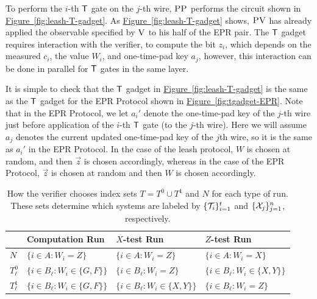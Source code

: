 \documentclass[11pt]{article}
\numberwithin{equation}{section}
\theoremstyle{definition}
\theoremstyle{plain}
\newcommand{\expref}[2]{\hyperref[#2]{#1~\ref{#2}}}
\newcommand{\ver}{\textsc{V}}
\newcommand{\pv}{\textsc{PV}}
\newcommand{\pp}{\textsc{PP}}
\begin{document}
To perform the $i$-th $\sf T$ gate on the $j$-th wire, $\pp$ performs the circuit shown in \expref{Figure}{fig:leash-T-gadget}. As \expref{Figure}{fig:leash-T-gadget} shows, $\pv$ has already applied the observable specified by $\ver$ to his half of the EPR pair. The $\sf T$ gadget requires interaction with the verifier, to compute the bit $z_i$, which depends on the measured $c_i$, the value $W_i$, and one-time-pad key $a_j$, however, this interaction can be done in parallel for $\sf T$ gates in the same layer. 


It is simple to check that the $\sf T$ gadget in \expref{Figure}{fig:leash-T-gadget} is the same as the $\sf T$ gadget for the EPR Protocol shown in \expref{Figure}{fig:tgadget-EPR}. Note that in the EPR Protocol, we let $a_i'$ denote the one-time-pad key of the $j$-th wire just before application of the $i$-th $\sf T$ gate (to the $j$-th wire). Here we will assume $a_j$ denotes the current updated one-time-pad key of the $j$th wire, so it is the same as $a_i'$ in the EPR Protocol. In the case of the leash protocol, $W$ is chosen at random, and then $\vec{z}$ is chosen accordingly, whereas in the case of the EPR Protocol, $\vec{z}$ is chosen at random and then $W$ is chosen accordingly. 




\begin{table}[H]
\centering
\setlength\tabcolsep{1.5pt}
\begin{tabular}{|l|lll|}
\hline
& Computation Run & $X$-test Run & $Z$-test Run\\
\hline
$N$ & $\{i\in A:W_i=Z\}$ & $\{i\in A:W_i=Z\}$ & $\{i\in A:W_i=X\}$\\
$T^0_{\ell}$ & $\{i\in B_{\ell}:W_i\in \{G,F\}\}$ & $\{i\in B_{\ell}:W_i=Z\}$ & $\{i\in B_{\ell}:W_i\in \{X,Y\}\}$ \\
$T^1_{\ell}$ & $\{i\in B_{\ell}:W_i\in \{G,F\}\}$ & $\{i\in B_{\ell}:W_i\in \{X,Y\}\}$ & $\{i\in B_{\ell}:W_i=Z\}$ \\
\hline
\end{tabular}
\caption{How the verifier chooses index sets $T=T^0\cup T^1$ and $N$ for each type of run. These sets determine which systems are labeled by $\{{\cal T}_{i}\}_{i=1}^t$ and $\{{\cal X}_{j}\}_{j=1}^n$, respectively.
%
%
%
}   %
\label{tab:index-choices}
\end{table}
\end{document}
